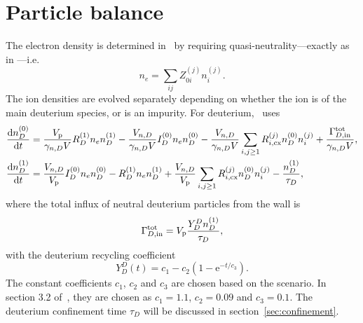 \documentclass{notes}
\newcommand{\ee}{\mathrm{e}}
\newcommand{\Vp}{V_{\rm p}}
\begin{document}
    \section{Particle balance}\label{sec:particles}
    The electron density is determined in \DYON\ by requiring 
    quasi-neutrality---exactly as in \DREAM---i.e.\
    \begin{equation}
        n_e = \sum_{ij} Z_{0i}^{(j)} n_i^{(j)}.
    \end{equation}
    The ion densities are evolved separately depending on whether the ion is of
    the main deuterium species, or is an impurity. For deuterium, \DYON\ uses
    \begin{equation}\label{eq:nD}
        \begin{aligned}
            \frac{\dd n_D^{(0)}}{\dd t} &=
                \frac{\Vp}{\gamma_{n,D}V}R_D^{(1)}n_en_D^{(1)}
                -\frac{V_{n,D}}{\gamma_{n,D}V}I_D^{(0)}n_en_D^{(0)}
                -\frac{V_{n,D}}{\gamma_{n,D}V}\sum_{i,j\geq 1} R_{i,{\rm cx}}^{(j)}n_D^{(0)}n_i^{(j)}
                + \frac{\Gamma_{D,{\rm in}}^{\rm tot}}{\gamma_{n,D}V},\\
            \frac{\dd n_D^{(1)}}{\dd t} &=
                \frac{V_{n,D}}{\Vp}I_D^{(0)}n_en_D^{(0)}
                -R_D^{(1)}n_en_D^{(1)}
                +\frac{V_{n,D}}{\Vp}\sum_{i,j\geq1} R_{i,{\rm cx}}^{(j)} n_D^{(0)}n_i^{(j)}
                -\frac{n_D^{(1)}}{\tau_D},
        \end{aligned}
    \end{equation}
    where the total influx of neutral deuterium particles from the wall is
    \begin{equation}\label{eq:GammaDtot}
        \Gamma_{D,{\rm in}}^{\rm tot} = \Vp\frac{Y_D^D n_D^{(1)}}{\tau_D},
    \end{equation}
    with the deuterium recycling coefficient
    \begin{equation}\label{eq:deut:recyc}
        Y_D^D(t) = c_1 - c_2\left( 1-\ee^{-t/c_3} \right).
    \end{equation}
    The constant coefficients $c_1$, $c_2$ and $c_3$ are chosen based on the
    scenario. In section 3.2 of~\cite{Kim2012}, they are chosen as $c_1=1.1$,
    $c_2=0.09$ and $c_3=0.1$. The deuterium confinement time $\tau_D$ will be
    discussed in section~\ref{sec:confinement}.
\end{document}
